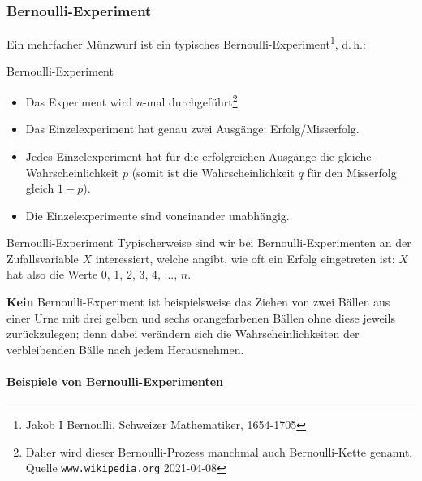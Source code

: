 

\subsubsection{Bernoulli-Experiment}
Ein mehrfacher Münzwurf ist ein typisches
Bernoulli-Experiment\footnote{Jakob I Bernoulli, Schweizer Mathematiker,
  1654-1705}, d.\,h.:

\begin{definition}{Bernoulli-Experiment}{}
\begin{itemize}
\item Das Experiment wird $n$-mal durchgeführt\footnote{Daher wird dieser
Bernoulli-Prozess manchmal auch Bernoulli-Kette genannt. Quelle
\texttt{www.wikipedia.org} 2021-04-08}.
\item Das Einzelexperiment hat genau zwei Ausgänge: Erfolg/Misserfolg.
\item Jedes Einzelexperiment hat für die erfolgreichen Ausgänge die gleiche
      Wahrscheinlichkeit $p$ (somit ist die Wahrscheinlichkeit $q$ für den
      Misserfolg gleich $1-p$).
\item Die Einzelexperimente sind voneinander unabhängig.
\end{itemize}
\end{definition}

\begin{bemerkung}{Bernoulli-Experiment}{}
Typischerweise sind wir bei Bernoulli-Experimenten an der
Zufallsvariable $X$ interessiert, welche angibt, wie oft ein Erfolg
eingetreten ist: $X$ hat also die Werte 0, 1, 2, 3, 4, ..., $n$.
\end{bemerkung}

\textbf{Kein} Bernoulli-Experiment ist beispielsweise das Ziehen von zwei Bällen aus
einer Urne mit drei gelben und sechs orangefarbenen Bällen ohne diese
jeweils zurückzulegen; denn dabei verändern sich die
Wahrscheinlichkeiten der verbleibenden Bälle nach jedem Herausnehmen.
\newpage


\paragraph{Beispiele von Bernoulli-Experimenten}

